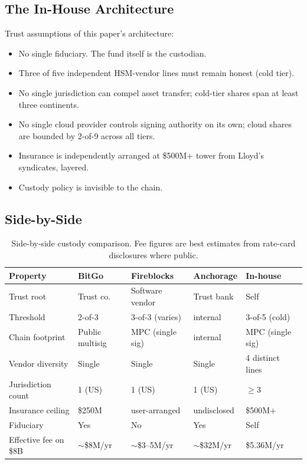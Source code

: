 \subsection{The In-House Architecture}

Trust assumptions of this paper's architecture:

\begin{itemize}[nosep]
\item No single fiduciary. The fund itself is the custodian.
\item Three of five independent HSM-vendor lines must remain honest
(cold tier).
\item No single jurisdiction can compel asset transfer; cold-tier
shares span at least three continents.
\item No single cloud provider controls signing authority on its
own; cloud shares are bounded by 2-of-9 across all tiers.
\item Insurance is independently arranged at \$500M+ tower from
Lloyd's syndicates, layered.
\item Custody policy is invisible to the chain.
\end{itemize}

\subsection{Side-by-Side}

\begin{table}[h]
\centering
\small
\begin{tabular}{p{3.5cm}p{2.4cm}p{2.6cm}p{2.4cm}p{3cm}}
\toprule
\textbf{Property} & \textbf{BitGo} & \textbf{Fireblocks} &
\textbf{Anchorage} & \textbf{In-house} \\
\midrule
Trust root & Trust co. & Software vendor & Trust bank & Self \\
Threshold & 2-of-3 & 3-of-3 (varies) & internal & 3-of-5 (cold) \\
Chain footprint & Public multisig & MPC (single sig) & internal & MPC (single sig) \\
Vendor diversity & Single & Single & Single & 4 distinct lines \\
Jurisdiction count & 1 (US) & 1 (US) & 1 (US) & $\geq 3$ \\
Insurance ceiling & \$250M & user-arranged & undisclosed & \$500M+ \\
Fiduciary & Yes & No & Yes & Self \\
Effective fee on \$8B & $\sim$\$8M/yr & $\sim$\$3--5M/yr & $\sim$\$32M/yr & \$5.36M/yr \\
\bottomrule
\end{tabular}
\caption{Side-by-side custody comparison. Fee figures
are best estimates from rate-card disclosures where public.}
\label{tab:side-by-side}
\end{table}

